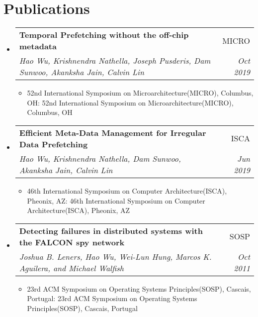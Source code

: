 \documentclass[letterpaper,10pt]{article}
\makeatletter
\def \ifempty#1{\def\temp{#1} \ifx\temp\empty }
\newcommand{\resumeItem}[2]{
  \item\small{
  	\ifempty{#1}#2\else\textbf{#1}{: #2 \vspace{-2pt}}\fi
  }
}
\newcommand{\resumeSubheading}[4]{
  \vspace{-1pt}\item
    \begin{tabular*}{0.97\textwidth}{l@{\extracolsep{\fill}}r}
      \textbf{#1} & #2 \\
      \textit{\small#3} & \textit{\small #4} \\
    \end{tabular*}\vspace{-5pt}
}
\newcommand{\resumeSubHeadingListStart}{\begin{itemize}[leftmargin=*]}
\newcommand{\resumeSubHeadingListEnd}{\end{itemize}}
\newcommand{\resumeItemListStart}{\begin{itemize}}
\newcommand{\resumeItemListEnd}{\end{itemize}\vspace{-5pt}}
\makeatother
\begin{document}
\section{Publications}
  \resumeSubHeadingListStart
    \resumeSubheading
        {Temporal Prefetching without the off-chip metadata} {MICRO}
        {Hao Wu, Krishnendra Nathella, Joseph Pusderis, Dam Sunwoo,
    Akanksha Jain, Calvin Lin}{Oct 2019}
	 \resumeItemListStart
    \resumeItem{}{52nd International Symposium on Microarchitecture(MICRO), Columbus, OH}
      \resumeItemListEnd

    \resumeSubheading{Efficient Meta-Data Management for Irregular Data
    Prefetching} {ISCA}
        {Hao Wu, Krishnendra Nathella, Dam Sunwoo, Akanksha Jain, Calvin
Lin} {Jun 2019}
	 \resumeItemListStart
        \resumeItem{}{46th International Symposium on Computer
        Architecture(ISCA), Pheonix, AZ}
      \resumeItemListEnd

\resumeSubheading{
Detecting failures in distributed systems with the FALCON spy network}
{SOSP}
{Joshua B. Leners, Hao Wu, Wei-Lun Hung, Marcos K. Aguilera, and Michael
Walfish} {Oct 2011}
	 \resumeItemListStart
        \resumeItem{}{23rd ACM Symposium on Operating Systems Principles(SOSP),
        Cascais, Portugal}
      \resumeItemListEnd
  \resumeSubHeadingListEnd
\end{document}
